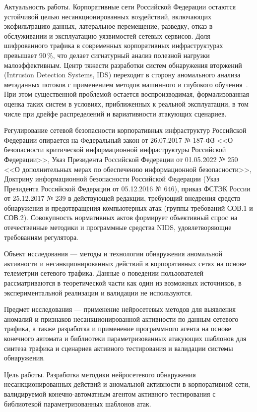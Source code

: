 
Актуальность работы. Корпоративные сети Российской Федерации
остаются устойчивой целью несанкционированных воздействий,
включающих эксфильтрацию данных, латеральное перемещение,
разведку, отказ в обслуживании и эксплуатацию уязвимостей сетевых
сервисов. Доля шифрованного трафика в современных корпоративных
инфраструктурах превышает 90\,\%, что делает сигнатурный анализ
полезной нагрузки малоэффективным. Центр тяжести разработки систем
обнаружения вторжений (Intrusion Detection Systems, IDS)
переходит в сторону аномального анализа метаданных потоков с
применением методов машинного и глубокого обучения~\cite{khraisat2019survey,
ahmad2021nids}. При этом существенной проблемой остается
воспроизводимая, формализованная оценка таких систем в условиях,
приближенных к реальной эксплуатации, в том числе при дрейфе
распределений и вариативности атакующих сценариев.

Регулирование сетевой безопасности корпоративных инфраструктур
Российской Федерации опирается на Федеральный закон от 26.07.2017
№ 187-ФЗ <<О безопасности критической информационной инфраструктуры
Российской Федерации>>, Указ Президента Российской Федерации от
01.05.2022 № 250 <<О дополнительных мерах по обеспечению
информационной безопасности>>, Доктрину информационной
безопасности Российской Федерации (Указ Президента Российской
Федерации от 05.12.2016 № 646), приказ ФСТЭК России от 25.12.2017
№ 239 в действующей редакции, требующий внедрения средств
обнаружения и предотвращения компьютерных атак (группы требований
СОВ.1 и СОВ.2). Совокупность нормативных актов формирует объективный
спрос на отечественные методики и программные средства NIDS,
удовлетворяющие требованиям регулятора.

Объект исследования --- методы и технологии обнаружения аномальной
активности и несанкционированных действий в корпоративных сетях на
основе телеметрии сетевого трафика. Данные о поведении пользователей
рассматриваются в теоретической части как один из возможных
источников, в экспериментальной реализации и валидации не
используются.

Предмет исследования --- применение нейросетевых методов для
выявления аномалий и признаков несанкционированной активности по
данным сетевого трафика, а также разработка и применение
программного агента на основе конечного автомата и библиотеки
параметризованных атакующих шаблонов для синтеза трафика и
сценариев активного тестирования и валидации системы обнаружения.

Цель работы. Разработка методики нейросетевого обнаружения
несанкционированных действий и аномальной активности в
корпоративной сети, валидируемой конечно-автоматным агентом
активного тестирования с библиотекой параметризованных шаблонов
атак.

